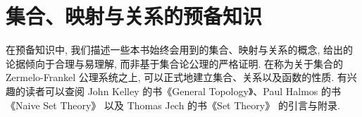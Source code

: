 \documentclass[../main.tex]{subfiles}
\begin{document}
\setcounter{chapter}{-1}
\chapter{集合、映射与关系的预备知识}\label{chapter:ch00-预备知识}

在预备知识中, 我们描述一些本书始终会用到的集合、映射与关系的概念, 给出的论据倾向于合理与易理解, 而非基于集合论公理的严格证明. 在称为关于集合的 Zermelo-Frankel 公理系统之上, 可以正式地建立集合、关系以及函数的性质. 有兴趣的读者可以查阅 John Kelley 的书《General Topology》\cite{Kel75}、Paul Halmos 的书《Naive Set Theory》\cite{Hal98} 以及 Thomas Jech 的书《Set Theory》\cite{Jec06} 的引言与附录.






\end{document}
